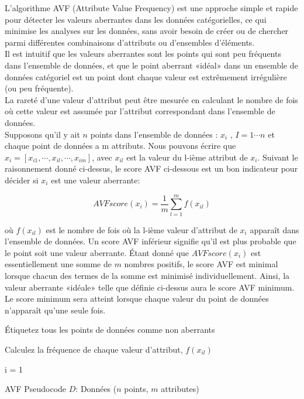 L'algorithme AVF (Attribute Value Frequency) est une approche simple et rapide pour détecter les valeurs aberrantes dans les données catégorielles, ce qui minimise les analyses sur les données, sans avoir besoin de créer ou de chercher parmi différentes combinaisons d’attributs ou d'ensembles d'éléments.  \\

\noindent Il est intuitif que les valeurs aberrantes sont les points qui sont peu fréquents dans l'ensemble de données, et que le point aberrant «idéal» dans un ensemble de données catégoriel est un point dont chaque valeur est extrêmement irrégulière (ou peu fréquente). \\


\noindent La rareté d'une valeur d'attribut peut être mesurée en calculant le nombre de fois où cette valeur est assumée par l'attribut correspondant dans l'ensemble de données. \\

\noindent Supposons qu'il y ait $n$ points dans l'ensemble de données : $x_i$ , $I = 1 \cdots n$ et chaque point de données a m attributs. Nous pouvons écrire que $x_{i} = [x_{i1}, \cdots , x_{il}, \cdots, x_{im}]$, avec $x_{il}$ est la valeur du l-ième attribut de $x_i$. Suivant le raisonnement donné ci-dessus, le score AVF ci-dessous est un bon indicateur pour décider si $x_i$ est une valeur aberrante:

$$AVFscore(x_i) = \frac{1}{m} \sum_{l=1}^{m}f(x_{il})$$


\noindent où $f(x_{il})$ est le nombre de fois où la l-ième valeur d'attribut de $x_i$ apparaît dans l'ensemble de données. Un score AVF inférieur signifie qu'il est plus probable que le point soit une valeur aberrante. Étant donné que $AVFscore(x_i) $ est essentiellement une somme de $m$ nombres positifs, le score AVF est minimal lorsque chacun des termes de la somme est minimisé individuellement. Ainsi, la valeur aberrante «idéale» telle que définie ci-dessus aura le score AVF minimum. Le score minimum sera atteint lorsque chaque valeur du point de données n'apparaît qu'une seule fois.  


\begin{algorithm}
\SetAlgoLined
Étiquetez tous les points de données comme non aberrants \;

Calculez la fréquence de chaque valeur d'attribut, $f(x_{il})$ \;

i = 1 \;


\caption{AVF Pseudocode $D$: Données ($n$ points, $m$ attributes)}
\label{alg:AVF}
\end{algorithm}%

